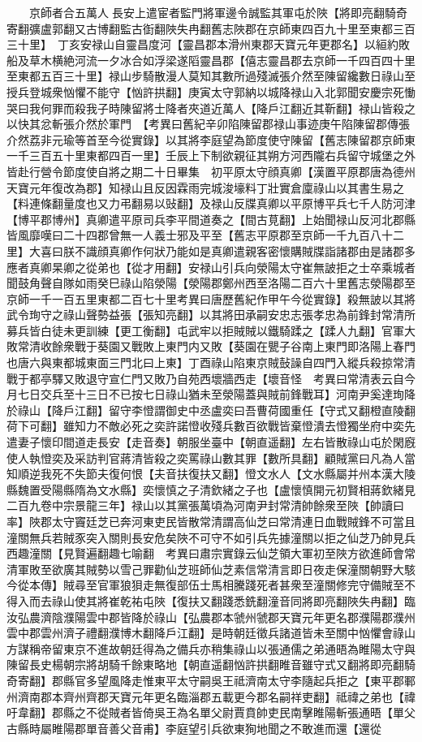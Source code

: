 　　京師者合五萬人長安上遣宦者監門將軍邊令誠監其軍屯於陜【將即亮翻騎奇寄翻彍盧郭翻又古博翻監古衘翻陜失冉翻舊志陜郡在京師東四百九十里至東都三百三十里】　丁亥安禄山自靈昌度河【靈昌郡本滑州東郡天寶元年更郡名】以絙約敗船及草木横絶河流一夕冰合如浮梁遂䧟靈昌郡【僖志靈昌郡去京師一千四百四十里至東都五百三十里】禄山步騎散漫人莫知其數所過殘滅張介然至陳留纔數日祿山至授兵登城衆忷懼不能守【忷許拱翻】庚寅太守郭納以城降禄山入北郭聞安慶宗死慟哭曰我何罪而殺我子時陳留將士降者夾道近萬人【降戶江翻近其靳翻】禄山皆殺之以快其忿斬張介然於軍門　【考異曰舊紀辛卯陷陳留郡禄山事迹庚午陷陳留郡傳張介然荔非元瑜等首至今從實錄】以其將李庭望為節度使守陳留【舊志陳留郡京師東一千三百五十里東都四百一里】壬辰上下制欲親征其朔方河西隴右兵留守城堡之外皆赴行營令節度使自將之期二十日畢集　初平原太守顔真卿【漢置平原郡唐為德州天寶元年復改為郡】知禄山且反因霖雨完城浚壕料丁壯實倉廩祿山以其書生易之【料連條翻量度也又力弔翻易以䜴翻】及禄山反牒真卿以平原博平兵七千人防河津【博平郡博州】真卿遣平原司兵李平間道奏之【間古莧翻】上始聞禄山反河北郡縣皆風靡嘆曰二十四郡曾無一人義士邪及平至【舊志平原郡至京師一千九百八十二里】大喜曰朕不識顔真卿作何狀乃能如是真卿遣親客密懷購賊牒詣諸郡由是諸郡多應者真卿杲卿之從弟也【從才用翻】安禄山引兵向滎陽太守崔無詖拒之士卒乘城者聞鼓角聲自隊如雨癸巳祿山陷滎陽【滎陽郡鄭州西至洛陽二百六十里舊志滎陽郡至京師一千一百五里東都二百七十里考異曰唐歷舊紀作甲午今從實錄】殺無詖以其將武令珣守之祿山聲勢益張【張知亮翻】以其將田承嗣安忠志張孝忠為前鋒封常清所募兵皆白徒未更訓練【更工衡翻】屯武牢以拒賊賊以鐵騎蹂之【蹂人九翻】官軍大敗常清收餘衆戰于葵園又戰敗上東門内又敗【葵園在甖子谷南上東門即洛陽上春門也唐六與東都城東面三門北曰上東】丁酉祿山陷東京賊鼔譟自四門入縱兵殺掠常清戰于都亭驛又敗退守宣仁門又敗乃自苑西壞牆西走【壞音怪　考異曰常清表云自今月七日交兵至十三日不已按七日祿山猶未至滎陽蓋與賊前鋒戰耳】河南尹奚達珣降於祿山【降戶江翻】留守李憕謂御史中丞盧奕曰吾曹荷國重任【守式又翻橙直陵翻荷下可翻】雖知力不敵必死之奕許諾憕收殘兵數百欲戰皆棄憕潰去憕獨坐府中奕先遣妻子懷印間道走長安【走音奏】朝服坐臺中【朝直遥翻】左右皆散祿山屯於閑廐使人執憕奕及采訪判官蔣清皆殺之奕罵祿山數其罪【數所具翻】顧賊黨曰凡為人當知順逆我死不失節夫復何恨【夫音扶復扶又翻】憕文水人【文水縣屬并州本漢大陵縣魏置受陽縣隋為文水縣】奕懷慎之子清欽緒之子也【盧懷慎開元初賢相蔣欽緒見二百九卷中宗景龍三年】禄山以其黨張萬頃為河南尹封常清帥餘衆至陜【帥讀曰率】陜郡太守竇廷芝已奔河東吏民皆散常清謂高仙芝曰常清連日血戰賊鋒不可當且潼關無兵若賊豕突入關則長安危矣陜不可守不如引兵先據潼關以拒之仙芝乃帥見兵西趣潼關【見賢遍翻趣七喻翻　考異曰肅宗實錄云仙芝領大軍初至陜方欲進師會常清軍敗至欲廣其賊勢以雪己罪勸仙芝班師仙芝素信常清言即日夜走保潼關朝野大駭今從本傳】賊尋至官軍狼狽走無復部伍士馬相騰踐死者甚衆至潼關修完守備賊至不得入而去祿山使其將崔乾祐屯陜【復扶又翻踐悉銑翻潼音同將即亮翻陜失冉翻】臨汝弘農濟陰濮陽雲中郡皆降於祿山【弘農郡本虢州虢郡天寶元年更名郡濮陽郡濮州雲中郡雲州濟子禮翻濮博木翻降戶江翻】是時朝廷徵兵諸道皆未至關中忷懼會祿山方謀稱帝留東京不進故朝廷得為之備兵亦稍集祿山以張通儒之弟通晤為睢陽太守與陳留長史楊朝宗將胡騎千餘東略地【朝直遥翻忷許拱翻睢音雖守式又翻將即亮翻騎奇寄翻】郡縣官多望風降走惟東平太守嗣吳王祗濟南太守李隨起兵拒之【東平郡鄆州濟南郡本齊州齊郡天寶元年更名臨淄郡五載更今郡名嗣祥吏翻】祗禕之弟也【禕吁韋翻】郡縣之不從賊者皆倚吳王為名單父尉賈賁帥吏民南擊睢陽斬張通晤【單父古縣時屬睢陽郡單音善父音甫】李庭望引兵欲東狥地聞之不敢進而還【還從